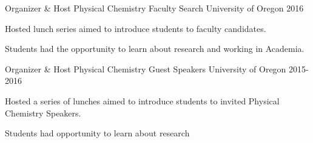 
\begin{cventries}
  \cventry
    {Organizer \& Host}
    {Physical Chemistry Faculty Search}
    {University of Oregon}
    {2016}
    {
      \begin{cvitems}
        \item{Hosted lunch series aimed to introduce students to faculty candidates.}
        \item{Students had the opportunity to learn about research and working in Academia.}
      \end{cvitems}
    }

  \cventry
    {Organizer \& Host}
    {Physical Chemistry Guest Speakers}
    {University of Oregon}
    {2015-2016}
    {
      \begin{cvitems}
        \item{Hosted a series of lunches aimed to introduce students to invited Physical Chemistry Speakers.}
        \item{Students had opportunity to learn about research}
      \end{cvitems}
    }
\end{cventries}
